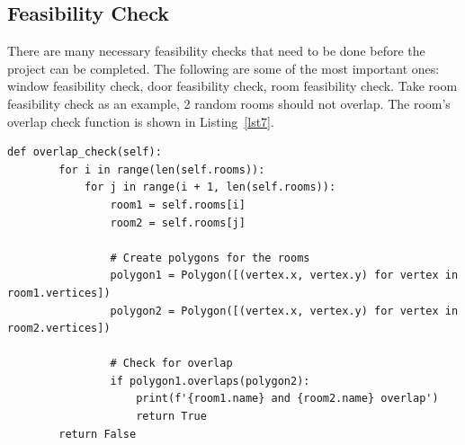 \documentclass[]{article}
\begin{document}
\subsection{Feasibility Check}
There are many necessary feasibility checks that need to be done before the project can be completed. The following are some of the most important ones: window feasibility check, door feasibility check, room feasibility check. Take room feasibility check as an example, 2 random rooms should not overlap. The room's overlap check function is shown in Listing~\ref{lst7}.
\begin{lstlisting}[caption=Room overlap check, label=lst7]
  def overlap_check(self):
        for i in range(len(self.rooms)):
            for j in range(i + 1, len(self.rooms)):
                room1 = self.rooms[i]
                room2 = self.rooms[j]
                
                # Create polygons for the rooms
                polygon1 = Polygon([(vertex.x, vertex.y) for vertex in room1.vertices])
                polygon2 = Polygon([(vertex.x, vertex.y) for vertex in room2.vertices])
                
                # Check for overlap
                if polygon1.overlaps(polygon2):
                    print(f'{room1.name} and {room2.name} overlap')
                    return True
        return False
\end{lstlisting}
\end{document}

